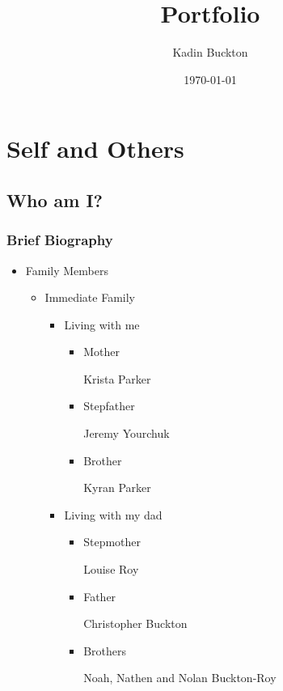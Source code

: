 \documentclass[11pt]{article}
\author{Kadin Buckton}
\date{\today}
\title{Portfolio}
\begin{document}
\maketitle

\section*{Self and Others}
\label{sec:orgaa9ed88}
\subsection*{Who am I?}
\label{sec:orgb4cad6d}
\subsubsection*{Brief Biography}
\label{sec:org4e97e07}
\begin{itemize}
\item Family Members
\label{sec:orgf6bc0c3}
\begin{itemize}
\item Immediate Family
\label{sec:org9033694}
\begin{itemize}
\item Living with me
\label{sec:orgc6fb8f4}
\begin{itemize}
\item Mother
\label{sec:orgd70aa56}

Krista Parker

\item Stepfather
\label{sec:org8b9b6ee}

Jeremy Yourchuk

\item Brother
\label{sec:org886b712}

Kyran Parker
\end{itemize}

\item Living with my dad
\label{sec:org8ade15a}
\begin{itemize}
\item Stepmother
\label{sec:org9f2e0e0}

Louise Roy

\item Father
\label{sec:org170906b}

Christopher Buckton

\item Brothers
\label{sec:org4f75eab}

Noah, Nathen and Nolan Buckton-Roy
\end{itemize}
\end{itemize}
\end{itemize}


\end{itemize}
\end{document}

